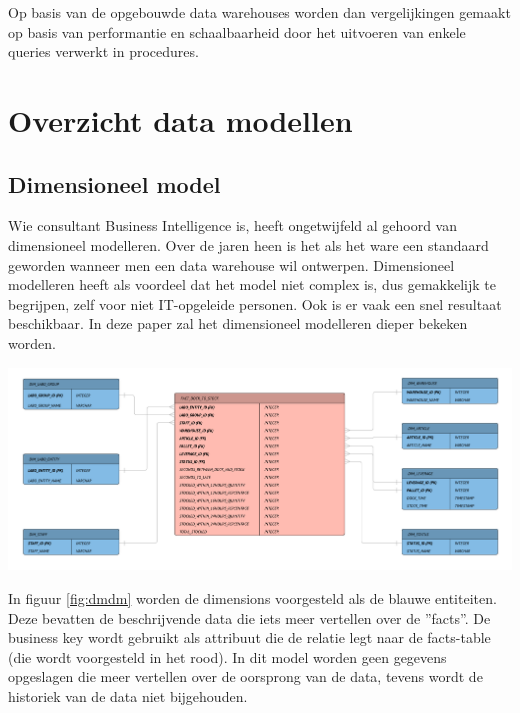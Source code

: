 \documentclass[a0,portrait]{a0poster}
\begin{document}
\begin{multicols}{2}
Op basis van de opgebouwde data warehouses worden dan vergelijkingen gemaakt op basis van performantie en schaalbaarheid door het uitvoeren van enkele queries verwerkt in procedures.

\color{HoGentAccent1} 
\section*{Overzicht data modellen}
\color{black}

\color{HoGentAccent1} 
\subsection*{Dimensioneel model}
\color{black}
Wie consultant Business Intelligence is, heeft ongetwijfeld al gehoord van dimensioneel modelleren. Over de jaren heen is het als het ware een standaard geworden wanneer men een data warehouse wil ontwerpen. Dimensioneel modelleren heeft als voordeel dat het model niet complex is, dus gemakkelijk te begrijpen, zelf voor niet IT-opgeleide personen. Ook is er vaak een snel resultaat beschikbaar. In deze paper zal het dimensioneel modelleren dieper bekeken worden. 
\begin{center}\vspace{1cm}
	\includegraphics[width=1.0\linewidth]{DimensioneelModel.png}
	\label{fig:dmdm}
\end{center}\vspace{1cm}

In figuur \ref{fig:dmdm}  worden de dimensions voorgesteld als de blauwe entiteiten. Deze bevatten de beschrijvende data die iets meer vertellen over de ''facts''. De business key wordt gebruikt als attribuut die de relatie legt naar de facts-table (die wordt voorgesteld in het rood). In dit model worden geen gegevens opgeslagen die meer vertellen over de oorsprong van de data, tevens wordt de historiek van de data niet bijgehouden.


\end{multicols}
\end{document}
